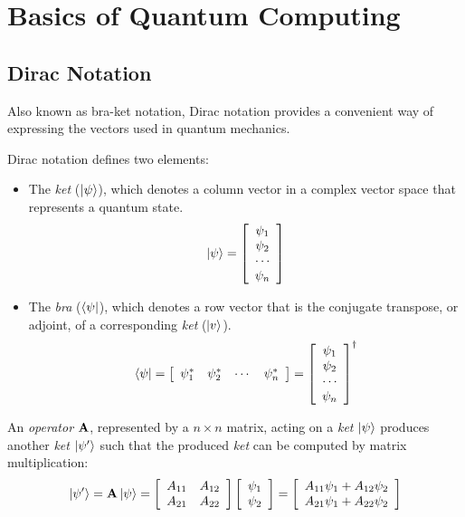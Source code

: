 %
%
\chapter {Basics of Quantum Computing}

\section{Dirac Notation}

Also known as bra-ket notation, Dirac notation provides a convenient way of expressing the vectors used in quantum mechanics.

Dirac notation defines two elements:

\begin{itemize}
    \item The \textit{ket} ($\left|{\psi}\right\rangle$), which denotes a column vector in a complex vector space that represents a quantum state.
    $$\left|{\psi}\right\rangle=\left[\begin{array}{c}\psi_{1} \\ \psi_{2} \\ \cdots \\ \psi_{n} \end{array}\right]$$
    \item The \textit{bra} ($\left\langle{\psi}\right|$), which denotes a row vector that is the conjugate transpose, or adjoint, of a corresponding \textit{ket} ($\left|{v}\right\rangle$).
    $$\left\langle{\psi}\right|=\left[\begin{array}{cccc}\psi_{1}^{*} & \psi_{2}^{*} & \cdots & \psi_{n}^{*}\end{array}\right]=\left[\begin{array}{c}\psi_{1} \\ \psi_{2} \\ \cdots \\ \psi_{n} \end{array}\right]^{\dagger}$$
\end{itemize}

An \textit{operator} $\bf{A}$, represented by a $n \times n$ matrix, acting on a \textit{ket} $\left|{\psi}\right\rangle$ produces another \textit{ket} $\left|{\psi'}\right\rangle$ such that the produced \textit{ket} can be computed by matrix multiplication:
$$\left|{\psi'}\right\rangle=\textbf{A}\left|{\psi}\right\rangle=\left[\begin{array}{cc}A_{11} & A_{12} \\ A_{21} & A_{22}\end{array}\right]\left[\begin{array}{c}\psi_{1} \\ \psi_{2}\end{array}\right]=\left[\begin{array}{c}A_{11}\psi_{1}+A_{12}\psi_{2} \\ A_{21}\psi_{1}+A_{22}\psi_{2}\end{array}\right]$$

